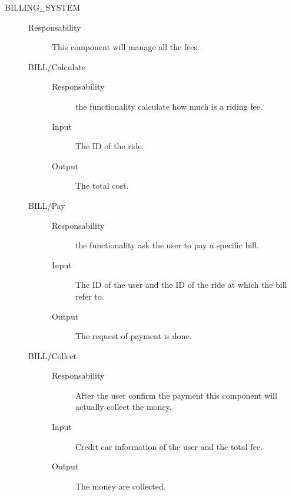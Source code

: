 \documentclass[11pt]{article} %
\begin{document}
\begin{description}
	\item[BILLING\_SYSTEM] \hfill
	\begin{description}
		\item[Responsability] This component will manage all the fees.
	\item[BILL/Calculate] \hfill
		\begin{description}
			\item[Responsability] the functionality calculate how much is a riding fee.
			\item[Input] The ID of the ride.
			\item[Output] The total cost.
		\end{description}
	\item[BILL/Pay] \hfill
		\begin{description}
			\item[Responsability] the functionality ask the user to pay a specific bill.
			\item[Input] The ID of the user and the ID of the ride at which the bill refer to.
			\item[Output] The request of payment is done.
		\end{description}
	\item[BILL/Collect] \hfill
		\begin{description}
			\item[Responsability] After the user confirm the payment this component will actually collect the money.
			\item[Input] Credit car information of the user and the total fee.
			\item[Output] The money are collected.
		\end{description}
	\end{description}


\end{description}
\end{document}
